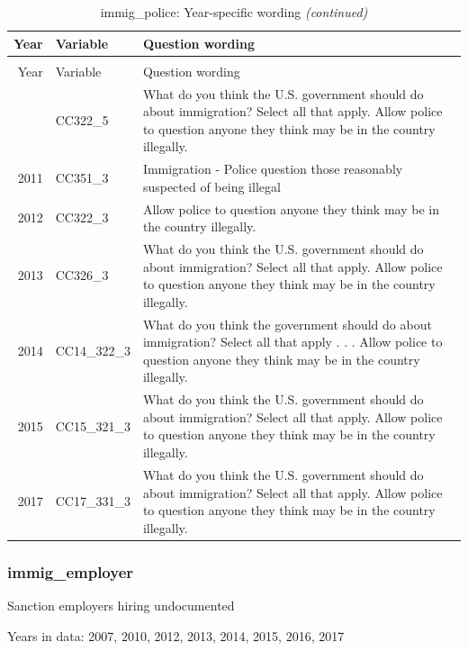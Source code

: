 \documentclass[12pt]{article}
\begin{document}
\begin{longtable}[t]{rl>{\raggedright\arraybackslash}p{10cm}}
\caption{\label{tab:unnamed-chunk-4}immig\_police: Year-specific wording}\\
\toprule
Year & Variable & Question wording\\
\midrule
\endfirsthead
\caption[]{immig\_police: Year-specific wording \textit{(continued)}}\\
\toprule
Year & Variable & Question wording\\
\midrule
\endhead
\
\endfoot
\bottomrule
\endlastfoot
2010 & CC322\_5 & What do you think the U.S. government should do about immigration? Select all that apply. Allow police to question anyone they think may be in the country illegally.\\
2011 & CC351\_3 & Immigration - Police question those reasonably suspected of being illegal\\
2012 & CC322\_3 & Allow police to question anyone they think may be in the country illegally.\\
2013 & CC326\_3 & What do you think the U.S. government should do about immigration? Select all that apply. Allow police to question anyone they think may be in the country illegally.\\
2014 & CC14\_322\_3 & What do you think the government should do about immigration? Select all that apply . . . Allow police to question anyone they think may be in the country illegally.\\
2015 & CC15\_321\_3 & What do you think the U.S. government should do about immigration? Select all that apply. Allow police to question anyone they think may be in the country illegally.\\
2017 & CC17\_331\_3 & What do you think the U.S. government should do about immigration? Select all that apply. Allow police to question anyone they think may be in the country illegally.\\*
\end{longtable}

\subsubsection{immig\_employer}\label{immig_employer}

Sanction employers hiring undocumented

Years in data: 2007, 2010, 2012, 2013, 2014, 2015, 2016, 2017
\end{document}
